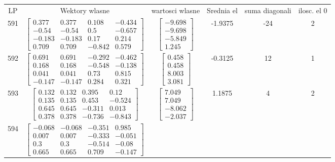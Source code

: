 \documentclass[a4paper,12pt]{article}
\begin{document}
\bgroup {} \vspace{0.2in} \begin{tabular}{c c c c c c}
LP &Wektory wlasne & wartosci wlasne & Srednia el & suma diagonali & ilosc. el 0\\
591
&
$\begin{bmatrix} 0.377 & 0.377 & 0.108 & -0.434 \\ -0.54 & -0.54 & 0.5 & -0.657 \\ -0.183 & -0.183 & 0.17 & 0.214 \\ 0.709 & 0.709 & -0.842 & 0.579 \end{bmatrix}$
&
$\begin{bmatrix} -9.698 \\ -9.698 \\ -5.849 \\ 1.245 \end{bmatrix}$
&
-1.9375
&
-24
&
2
\\
592
&
$\begin{bmatrix} 0.691 & 0.691 & -0.292 & -0.462 \\ 0.168 & 0.168 & -0.548 & -0.138 \\ 0.041 & 0.041 & 0.73 & 0.815 \\ -0.147 & -0.147 & 0.284 & 0.321 \end{bmatrix}$
&
$\begin{bmatrix} 0.458 \\ 0.458 \\ 8.003 \\ 3.081 \end{bmatrix}$
&
-0.3125
&
12
&
1
\\
593
&
$\begin{bmatrix} 0.132 & 0.132 & 0.395 & 0.12 \\ 0.135 & 0.135 & 0.453 & -0.524 \\ 0.645 & 0.645 & -0.311 & 0.013 \\ 0.378 & 0.378 & -0.736 & -0.843 \end{bmatrix}$
&
$\begin{bmatrix} 7.049 \\ 7.049 \\ -8.062 \\ -2.037 \end{bmatrix}$
&
1.1875
&
4
&
2
\\
594
&
$\begin{bmatrix} -0.068 & -0.068 & -0.351 & 0.985 \\ 0.007 & 0.007 & -0.333 & -0.051 \\ 0.3 & 0.3 & -0.514 & -0.08 \\ 0.665 & 0.665 & 0.709 & -0.147 \end{bmatrix}$

\end{tabular}
\end{document}
